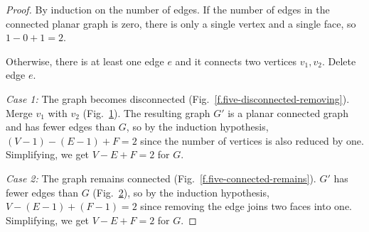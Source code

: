 \begin{proof}
By induction on the number of edges. If the number of edges in the connected planar graph is zero, there is only a single vertex and a single face, so $1-0+1=2$.

Otherwise, there is at least one edge $e$ and it connects two vertices $v_1,v_2$. Delete edge $e$.

\textit{Case 1:}
The graph becomes disconnected (Fig.~\ref{f.five-disconnected-removing}). Merge $v_1$ with $v_2$ (Fig.~\ref{f.five-disconnected-merge}). The resulting graph $G'$ is a planar connected graph and has fewer edges than $G$, so by the induction hypothesis, $(V-1)-(E-1)+F=2$ since the number of vertices is also reduced by one. Simplifying, we get $V-E+F=2$ for $G$.
\begin{figure}[ht]
\subfigures
{}
\hfill
{}
\label{f.five-disconnected-removing}
\label{f.five-disconnected-merge}
\end{figure}

\textit{Case 2:}
The graph remains connected (Fig.~\ref{f.five-connected-remains}). $G'$ has fewer edges than $G$ (Fig.~\ref{f.five-connected-fewer}), so by the induction hypothesis, $V-(E-1)+(F-1)=2$ since removing the edge joins two faces into one. Simplifying, we get $V-E+F=2$ for $G$.
\end{proof}

\begin{figure}[ht]
\subfigures
{}
\hfill
{}
\label{f.five-connected-remains}
\label{f.five-connected-fewer}
\end{figure}


